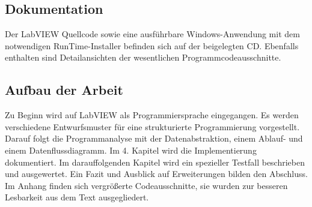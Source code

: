 
\subsection{Dokumentation}
Der LabVIEW Quellcode  sowie eine ausführbare Windows-Anwendung mit dem notwendigen RunTime-Installer befinden sich auf der beigelegten CD.
Ebenfalls enthalten sind Detailansichten der wesentlichen Programmcodeausschnitte.


\subsection{Aufbau der Arbeit}

Zu Beginn wird auf LabVIEW als Programmiersprache eingegangen. Es werden verschiedene Entwurfsmuster für eine strukturierte Programmierung vorgestellt.
Darauf folgt die Programmanalyse mit der Datenabstraktion, einem Ablauf-  und einem Datenflussdiagramm. 
Im 4. Kapitel wird die Implementierung dokumentiert. 
Im darauffolgenden Kapitel wird ein spezieller Testfall beschrieben und ausgewertet. 
Ein Fazit und Ausblick auf Erweiterungen bilden den Abschluss. 
Im Anhang finden sich vergrößerte Codeausschnitte, sie wurden zur besseren Lesbarkeit aus dem Text ausgegliedert.




